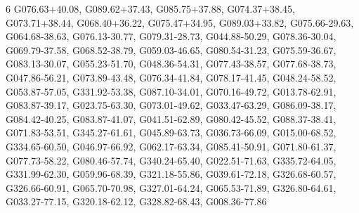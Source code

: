 \documentclass[12pt,a4paper]{article}
\newcommand{\numofcol}{6}
\begin{document}
\begin{multicols}{\numofcol}
G076.63+40.08, G089.62+37.43, G085.75+37.88, G074.37+38.45, G073.71+38.44, G068.40+36.22, G075.47+34.95, G089.03+33.82, G075.66-29.63, G064.68-38.63, G076.13-30.77, G079.31-28.73, G044.88-50.29, G078.36-30.04, G069.79-37.58, G068.52-38.79, G059.03-46.65, G080.54-31.23, G075.59-36.67, G083.13-30.07, G055.23-51.70, G048.36-54.31, G077.43-38.57, G077.68-38.73, G047.86-56.21, G073.89-43.48, G076.34-41.84, G078.17-41.45, G048.24-58.52, G053.87-57.05, G331.92-53.38, G087.10-34.01, G070.16-49.72, G013.78-62.91, G083.87-39.17, G023.75-63.30, G073.01-49.62, G033.47-63.29, G086.09-38.17, G084.42-40.25, G083.87-41.07, G041.51-62.89, G080.42-45.52, G088.37-38.41, G071.83-53.51, G345.27-61.61, G045.89-63.73, G036.73-66.09, G015.00-68.52, G334.65-60.50, G046.97-66.92, G062.17-63.34, G085.41-50.91, G071.80-61.37, G077.73-58.22, G080.46-57.74, G340.24-65.40, G022.51-71.63, G335.72-64.05, G331.99-62.30, G059.96-68.39, G321.18-55.86, G039.61-72.18, G326.68-60.57, G326.66-60.91, G065.70-70.98, G327.01-64.24, G065.53-71.89, G326.80-64.61, G033.27-77.15, G320.18-62.12, G328.82-68.43, G008.36-77.86
\end{multicols}
\end{document}
